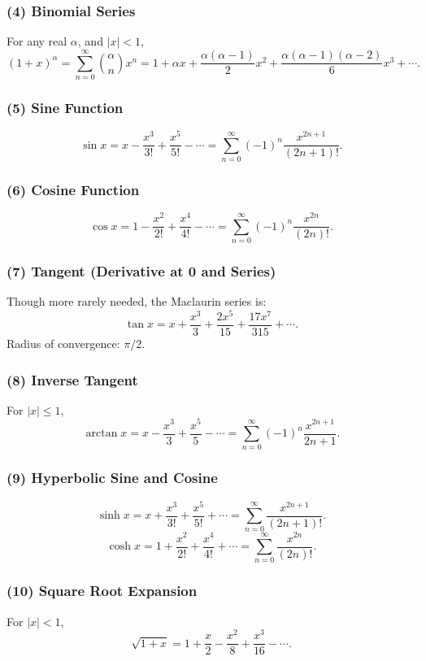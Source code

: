 \documentclass[10pt]{article}
\theoremstyle{definition}
\begin{document}
\subsubsection*{(4) Binomial Series}
For any real \(\alpha\), and \(|x|<1\),
\[
(1+x)^\alpha
    = \sum_{n=0}^{\infty}
      {\alpha \choose n} x^n
    = 1 + \alpha x + \frac{\alpha(\alpha-1)}{2}x^2
        + \frac{\alpha(\alpha-1)(\alpha-2)}{6}x^3 + \cdots.
\]

\subsubsection*{(5) Sine Function}
\[
\sin x
= x - \frac{x^3}{3!} + \frac{x^5}{5!} - \cdots
= \sum_{n=0}^{\infty} (-1)^n \frac{x^{2n+1}}{(2n+1)!}.
\]

\subsubsection*{(6) Cosine Function}
\[
\cos x
= 1 - \frac{x^2}{2!} + \frac{x^4}{4!} - \cdots
= \sum_{n=0}^{\infty} (-1)^n \frac{x^{2n}}{(2n)!}.
\]

\subsubsection*{(7) Tangent (Derivative at 0 and Series)}
Though more rarely needed, the Maclaurin series is:
\[
\tan x
= x + \frac{x^3}{3} + \frac{2x^5}{15} + \frac{17x^7}{315} + \cdots.
\]
Radius of convergence: \(\pi/2\).

\subsubsection*{(8) Inverse Tangent}
For \(|x|\le 1\),
\[
\arctan x
    = x - \frac{x^3}{3} + \frac{x^5}{5} - \cdots
    = \sum_{n=0}^{\infty} (-1)^n \frac{x^{2n+1}}{2n+1}.
\]

\subsubsection*{(9) Hyperbolic Sine and Cosine}
\[
\sinh x = x + \frac{x^3}{3!} + \frac{x^5}{5!} + \cdots
= \sum_{n=0}^\infty \frac{x^{2n+1}}{(2n+1)!}.
\]
\[
\cosh x = 1 + \frac{x^2}{2!} + \frac{x^4}{4!} + \cdots
= \sum_{n=0}^\infty \frac{x^{2n}}{(2n)!}.
\]

\subsubsection*{(10) Square Root Expansion}
For \(|x|<1\),
\[
\sqrt{1+x}
    = 1 + \frac{x}{2} - \frac{x^2}{8} + \frac{x^3}{16} - \cdots.
\]
\end{document}
